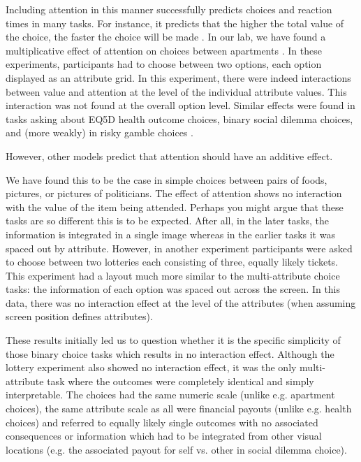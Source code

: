 \documentclass[doc, a4paper, apacite]{apa6}
\begin{document}
Including attention in this manner successfully predicts choices and reaction times in many tasks. 
For instance, it predicts that the higher the total value of the choice, the faster the choice will be made \cite{Smith2019}.
In our lab, we have found a multiplicative effect of attention on choices between apartments \cite{MullettStewartCamerer19}. 
In these experiments, participants had to choose between two options, each option displayed as an attribute grid. 
In this experiment, there were indeed interactions between value and attention at the level of the individual attribute values. 
This interaction was not found at the overall option level. 
Similar effects were found in tasks asking about EQ5D health outcome choices, binary social dilemma choices, and (more weakly) in risky gamble choices \cite{MullettRavichandar}. 



However, other models predict that attention should have an additive effect. 

We have found this to be the case in simple choices between pairs of foods, pictures, or pictures of politicians. 
The effect of attention shows no interaction with the value of the item being attended. 
Perhaps you might argue that these tasks are so different this is to be expected. 
After all, in the later tasks, the information is integrated in a single image whereas in the earlier tasks it was spaced out by attribute. 
However, in another experiment participants were asked to choose between two lotteries each consisting of three, equally likely tickets. 
This experiment had a layout much more similar to the multi-attribute choice tasks: the information of each option was spaced out across the screen. 
In this data, there was no interaction effect at the level of the attributes (when assuming screen position defines attributes). 

These results initially led us to question whether it is the specific simplicity of those binary choice tasks which results in no interaction effect. 
Although the lottery experiment also showed no interaction effect, it was the only multi-attribute task where the outcomes were completely identical and simply interpretable. 
The choices had the same numeric scale (unlike e.g. apartment choices), the same attribute scale as all were financial payouts (unlike e.g. health choices) and referred to equally likely single outcomes with no associated consequences or information which had to be integrated from other visual locations (e.g. the associated payout for self vs. other in social dilemma choice).
\end{document}
